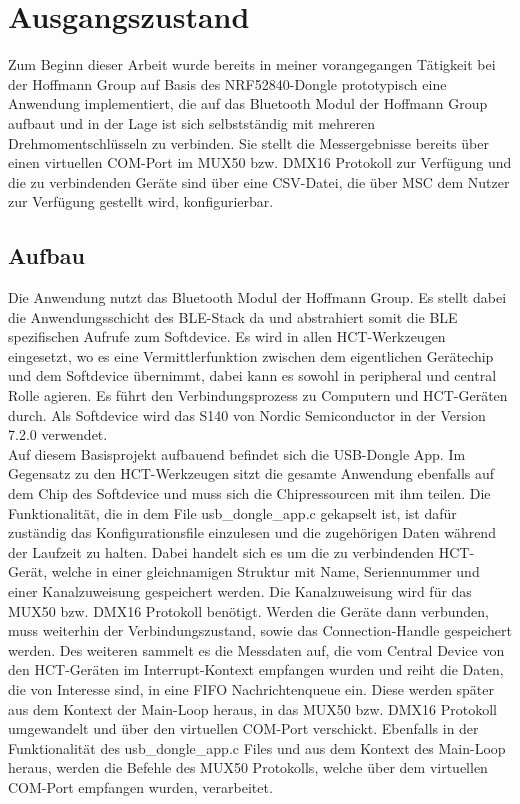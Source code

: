 \section{Ausgangszustand}
Zum Beginn dieser Arbeit wurde bereits in meiner vorangegangen Tätigkeit bei der Hoffmann Group auf Basis des NRF52840-Dongle prototypisch eine Anwendung implementiert, die auf das Bluetooth Modul der Hoffmann Group aufbaut und in der Lage ist sich selbstständig mit mehreren Drehmomentschlüsseln zu verbinden. Sie stellt die Messergebnisse bereits über einen virtuellen COM-Port im MUX50 bzw. DMX16 Protokoll zur Verfügung und die zu verbindenden Geräte sind über eine CSV-Datei, die über MSC dem Nutzer zur Verfügung gestellt wird, konfigurierbar.

\subsection{Aufbau}
Die Anwendung nutzt das Bluetooth Modul der Hoffmann Group. Es stellt dabei die Anwendungsschicht des BLE-Stack da und abstrahiert somit die BLE spezifischen Aufrufe zum Softdevice. Es wird in allen HCT-Werkzeugen eingesetzt, wo es eine Vermittlerfunktion zwischen dem eigentlichen Gerätechip und dem Softdevice übernimmt, dabei kann es sowohl in peripheral und central Rolle agieren. Es führt den Verbindungsprozess zu Computern und HCT-Geräten durch. Als Softdevice wird das S140 von Nordic Semiconductor in der Version 7.2.0 verwendet. \\
Auf diesem Basisprojekt aufbauend befindet sich die USB-Dongle App. Im Gegensatz zu den HCT-Werkzeugen sitzt die gesamte Anwendung ebenfalls auf dem Chip des Softdevice und muss sich die Chipressourcen mit ihm teilen. Die Funktionalität, die in dem File usb\_dongle\_app.c gekapselt ist, ist dafür zuständig das Konfigurationsfile einzulesen und die zugehörigen Daten während der Laufzeit zu halten. Dabei handelt sich es um die zu verbindenden HCT-Gerät, welche in einer gleichnamigen Struktur mit Name, Seriennummer und einer Kanalzuweisung gespeichert werden. Die Kanalzuweisung wird für das MUX50 bzw. DMX16 Protokoll benötigt. Werden die Geräte dann verbunden, muss weiterhin der Verbindungszustand, sowie das Connection-Handle gespeichert werden. Des weiteren sammelt es die Messdaten auf, die vom Central Device von den HCT-Geräten im Interrupt-Kontext empfangen wurden und reiht die Daten, die von Interesse sind, in eine FIFO Nachrichtenqueue ein. Diese werden später aus dem Kontext der Main-Loop heraus, in das MUX50 bzw. DMX16 Protokoll umgewandelt und über den virtuellen COM-Port verschickt. Ebenfalls in der Funktionalität des usb\_dongle\_app.c Files und aus dem Kontext des Main-Loop heraus, werden die Befehle des MUX50 Protokolls, welche über dem virtuellen COM-Port empfangen wurden, verarbeitet.\\
